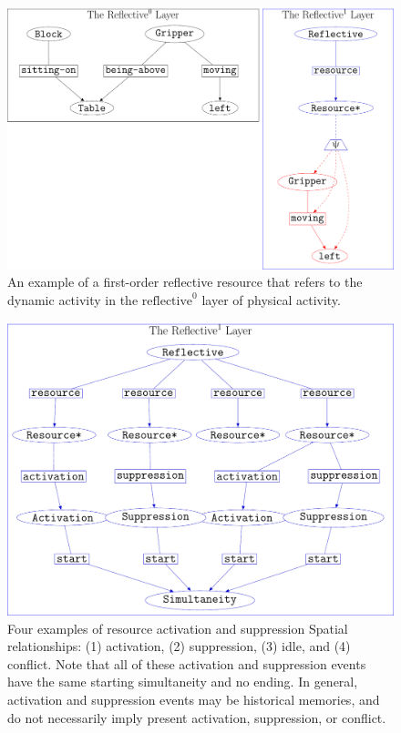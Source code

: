 \begin{figure}
\center
\includegraphics[width=12cm]{gfx/example_resource}
\caption[An example of a first-order reflective resource.]{An example
  of a first-order reflective resource that refers to the dynamic
  activity in the $\text{reflective}^0$ layer of physical activity.}
\label{figure:example_resource}
\end{figure}
\begin{figure}
\center
\includegraphics[width=12cm]{gfx/example_resource_conflict}
\caption[Four examples of resource activation and suppression Spatial
  relationships.]{Four examples of resource activation and suppression
  Spatial relationships: (1) activation, (2) suppression, (3) idle,
  and (4) conflict.  Note that all of these activation and suppression
  events have the same starting simultaneity and no ending.  In
  general, activation and suppression events may be historical
  memories, and do not necessarily imply present activation,
  suppression, or conflict.}
\label{figure:example_resource_conflict}
\end{figure}

